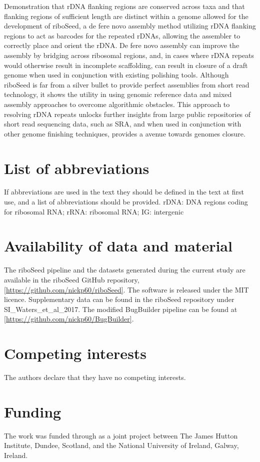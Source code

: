 \documentclass[11pt]{article}
\begin{document}
\begin{linenumbers}
Demonstration that rDNA flanking regions are conserved across taxa and that flanking regions of sufficient length are distinct within a genome allowed for the development of riboSeed, a de fere novo assembly method utilizing rDNA flanking regions to act as barcodes for the repeated rDNAs, allowing the assembler to correctly place and orient the rDNA. De fere novo assembly can improve the assembly by bridging across ribosomal regions, and, in cases where rDNA repeats would otherwise result in incomplete scaffolding, can result in closure of a draft genome when used in conjunction with existing polishing tools. Although riboSeed is far from a silver bullet to provide perfect assemblies from short read technology, it shows the utility in using genomic reference data and mixed assembly approaches to overcome algorithmic obstacles. This approach to resolving rDNA repeats unlocks further insights from large public repositories of short read sequencing data, such as SRA, and when used in conjunction with other genome finishing techniques, provides a avenue towards genomes closure.






\section*{List of abbreviations}
If abbreviations are used in the text they should be defined in the text at first use, and a list of abbreviations should be provided.
rDNA: DNA regions coding for ribosomal RNA; rRNA: ribosomal RNA; IG: intergenic


\section*{Availability of data and material}
The riboSeed pipeline and the datasets generated during the current study are available in the riboSeed GitHub repository, \ref{https://github.com/nickp60/riboSeed}. The software is released under the MIT licence. Supplementary data can be found in the riboSeed repository under SI\_Waters\_et\_al\_2017. The modified BugBuilder pipeline can be found at \ref{https://github.com/nickp60/BugBuilder}.
\section*{Competing interests}
The authors declare that they have no competing interests.
\section*{Funding}
The work was funded through as a joint project between The James Hutton Institute, Dundee, Scotland, and the National University of Ireland, Galway, Ireland.

\end{linenumbers}
\end{document}
